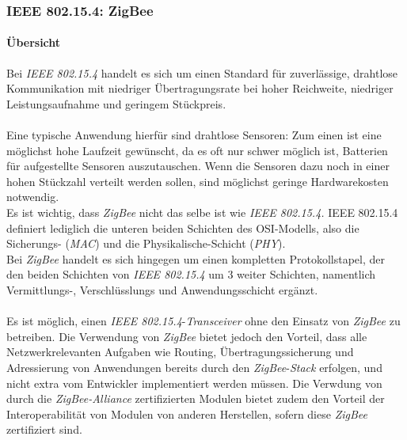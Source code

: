        \subsubsection{IEEE 802.15.4: ZigBee}

            \paragraph{Übersicht}
                Bei \emph{IEEE 802.15.4} handelt es sich um einen Standard für 
                zuverlässige, drahtlose Kommunikation mit niedriger Übertragungsrate
                bei hoher Reichweite, niedriger Leistungsaufnahme und geringem Stückpreis.\\
                \\
                Eine typische Anwendung hierfür sind drahtlose Sensoren: Zum einen
                ist eine möglichst hohe Laufzeit gewünscht, da es oft nur schwer
                möglich ist, Batterien für aufgestellte Sensoren auszutauschen.
                Wenn die Sensoren dazu noch in einer hohen Stückzahl verteilt werden
                sollen, sind möglichst geringe Hardwarekosten notwendig.
                \\
                Es ist wichtig, dass \emph{ZigBee} nicht das selbe ist wie \emph{IEEE 802.15.4.}
                IEEE 802.15.4 definiert lediglich die unteren beiden Schichten des
                OSI-Modells, also die Sicherungs- (\emph{MAC}) und die Physikalische-Schicht 
                (\emph{PHY}).\\
                Bei \emph{ZigBee} handelt es sich hingegen um einen kompletten Protokollstapel,
                der den beiden Schichten von \emph{IEEE 802.15.4} um 3 weiter Schichten,
                namentlich Vermittlungs-, Verschlüsslungs und Anwendungsschicht 
                ergänzt.  \\
                \\
                Es ist möglich, einen \emph{IEEE 802.15.4}-\emph{Transceiver} ohne den Einsatz
                von \emph{ZigBee} zu betreiben. Die Verwendung von \emph{ZigBee} bietet jedoch
                den Vorteil, dass alle Netzwerkrelevanten Aufgaben wie Routing,
                Übertragungssicherung und Adressierung von Anwendungen bereits
                durch den \emph{ZigBee}-\emph{Stack} erfolgen, und nicht extra vom Entwickler
                implementiert werden müssen. Die Verwdung von durch die
                \emph{ZigBee-Alliance} zertifizierten Modulen bietet zudem den
                Vorteil der Interoperabilität von Modulen von anderen Herstellen,
                sofern diese \emph{ZigBee} zertifiziert sind.

